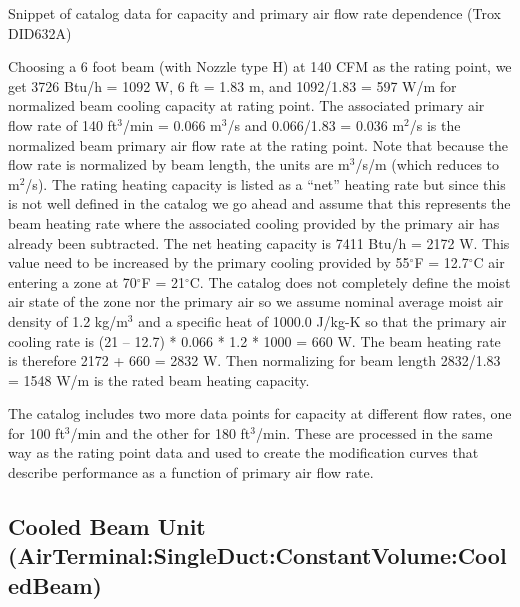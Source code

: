 Snippet of catalog data for capacity and primary air flow rate dependence (Trox DID632A)

Choosing a 6 foot beam (with Nozzle type H) at 140 CFM as the rating point, we get 3726 Btu/h = 1092 W, 6 ft = 1.83 m, and 1092/1.83 = 597 W/m for normalized beam cooling capacity at rating point. The associated primary air flow rate of 140 ft\(^{3}\)/min = 0.066 m\(^{3}\)/s and 0.066/1.83 = 0.036 m\(^{2}\)/s is the normalized beam primary air flow rate at the rating point. Note that because the flow rate is normalized by beam length, the units are m\(^{3}\)/s/m (which reduces to m\(^{2}\)/s). The rating heating capacity is listed as a ``net'' heating rate but since this is not well defined in the catalog we go ahead and assume that this represents the beam heating rate where the associated cooling provided by the primary air has already been subtracted. The net heating capacity is 7411 Btu/h = 2172 W. This value need to be increased by the primary cooling provided by 55\(^{\circ}\)F = 12.7\(^{\circ}\)C air entering a zone at 70\(^{\circ}\)F = 21\(^{\circ}\)C. The catalog does not completely define the moist air state of the zone nor the primary air so we assume nominal average moist air density of 1.2 kg/m\(^{3}\) and a specific heat of 1000.0 J/kg-K so that the primary air cooling rate is (21 -- 12.7) * 0.066 * 1.2 * 1000 = 660 W. The beam heating rate is therefore 2172 + 660 = 2832 W. Then normalizing for beam length 2832/1.83 = 1548 W/m is the rated beam heating capacity.

The catalog includes two more data points for capacity at different flow rates, one for 100 ft\(^{3}\)/min and the other for 180 ft\(^{3}\)/min. These are processed in the same way as the rating point data and used to create the modification curves that describe performance as a function of primary air flow rate.

\subsection{Cooled Beam Unit (AirTerminal:SingleDuct:ConstantVolume:CooledBeam)}\label{cooled-beam-unit-airterminalsingleductconstantvolumecooledbeam}

